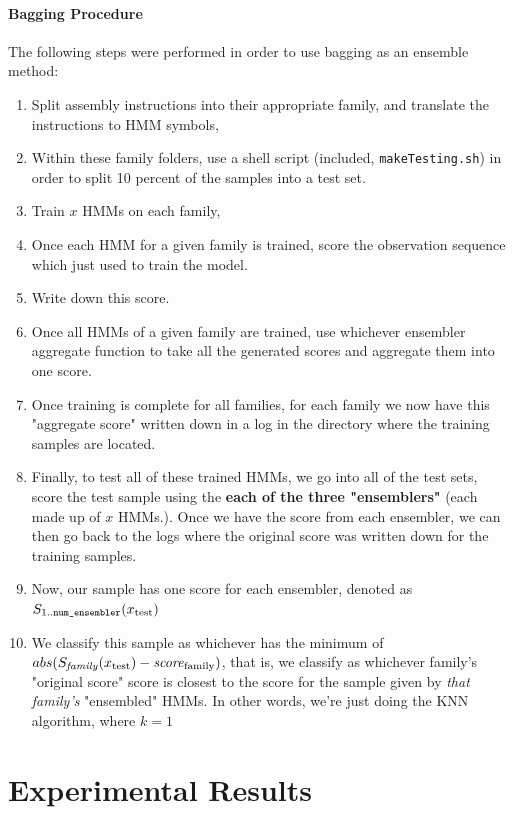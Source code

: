 \documentclass[12pt]{article}
\begin{document}
\subsection{Bagging Procedure}
  The following steps were performed in order to use bagging as an ensemble method:
  \begin{enumerate}
    \item Split assembly instructions into their appropriate family, and translate the instructions to HMM symbols,
    \item Within these family folders, use a shell script (included, \texttt{makeTesting.sh}) in order to split 10 percent of the samples into a test set.
    \item Train $x$ HMMs on each family,
    \item Once each HMM for a given family is trained, score the observation sequence which just used to train the model.
    \item Write down this score. 
    \item Once all HMMs of a given family are trained, use whichever ensembler aggregate function to take all the generated scores and aggregate them into one score. 
    \item Once training is complete for all families, for each family we now have this "aggregate score" written down in a log in the directory where the training samples are located.
    \item Finally, to test all of these trained HMMs, we go into all of the test sets, score the test sample using the \textbf{each of the three "ensemblers"} (each made up of $x$ HMMs.). Once we have the score from each ensembler, we can then go back to the logs where the original score was written down for the training samples. 
    \item Now, our sample has one score for each ensembler, denoted as $S_{1..\text{\texttt{num\_ensembler}}}(x_{\text{test}})$
    \item We classify this sample as whichever has the minimum of $abs(S_{\text{\textit{family}}}(x_{\text{test}}) - \text{\textit{score}}_\text{family} )$, that is, we classify as whichever family's "original score" score is closest to the score for the sample given by \textit{that family's} "ensembled" HMMs. In other words, we're just doing the KNN algorithm, where $k = 1$
  \end{enumerate}


\newpage
\part{Experimental Results}
\end{document}
